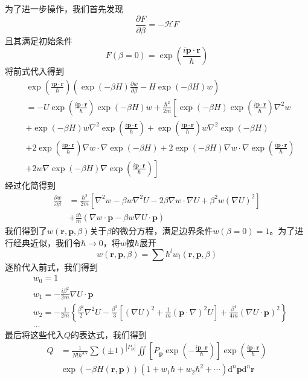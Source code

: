 \documentclass[hyperref,UTF8]{ctexbook}
\newcommand{\bm}[1]{\boldsymbol{#1}}
\begin{document}
为了进一步操作，我们首先发现
\[\frac{\partial F}{\partial\beta}=-\mathcal{H}F\]
且其满足初始条件
\[F(\beta=0)=\exp\left(\frac{i\bm{p}\cdot\bm{r}}{\hbar}\right)\]
将前式代入得到
\begin{align*}
	&\exp\left(\frac{i\bm{p}\cdot\bm{r}}{\hbar}\right)\left(\exp(-\beta H)\frac{\partial w}{\partial\beta}-H\exp(-\beta H)w\right)\\
	&=-U\exp\left(\frac{i\bm{p}\cdot\bm{r}}{\hbar}\right)\exp(-\beta H)w+\frac{\hbar^2}{2m}\left[\exp(-\beta H)\exp\left(\frac{i\bm{p}\cdot\bm{r}}{\hbar}\right)\nabla^2w\right.\\
	&+\exp(-\beta H)w\nabla^2\exp\left(\frac{i\bm{p}\cdot\bm{r}}{\hbar}\right)+\exp\left(\frac{i\bm{p}\cdot\bm{r}}{\hbar}\right)w\nabla^2\exp(-\beta H)\\
	&+2\exp\left(\frac{i\bm{p}\cdot\bm{r}}{\hbar}\right)\nabla w\cdot\nabla\exp(-\beta H)+2\exp(-\beta H)\nabla w\cdot\nabla\exp\left(\frac{i\bm{p}\cdot\bm{r}}{\hbar}\right)\\
	&\left.+2w\nabla\exp(-\beta H)\nabla\exp\left(\frac{i\bm{p}\cdot\bm{r}}{\hbar}\right)\right]
\end{align*}
经过化简得到
\begin{align*}
	\frac{\partial w}{\partial\beta}&=\frac{\hbar^2}{2m}\left[\nabla^2w-\beta w\nabla^2U-2\beta\nabla w\cdot\nabla U+\beta^2w(\nabla U)^2\right]\\
	&+\frac{i\hbar}{m}(\nabla w\cdot\bm{p}-\beta w\nabla U\cdot\bm{p})
\end{align*}
我们得到了$w(\bm{r},\bm{p},\beta)$关于$\beta$的微分方程，满足边界条件$w(\beta=0)=1$。为了进行经典近似，我们令$\hbar\rightarrow0$，将$w$按$\hbar$展开
\[w(\bm{r},\bm{p},\beta)=\sum\hbar^lw_l(\bm{r},\bm{p},\beta)\]
逐阶代入前式，我们得到
\begin{align*}
	&w_0=1\\
	&w_1=-\frac{i\beta^2}{2m}\nabla U\cdot\bm{p}\\
	&w_2=-\frac{1}{2m}\left\{\frac{\beta^2}{2}\nabla^2U-\frac{\beta^3}{3}\left[(\nabla U)^2+\frac{1}{m}(\bm{p}\cdot\nabla)^2U\right]+\frac{\beta^4}{4m}(\nabla U\cdot\bm{p})^2\right\}\\
	&\dots
\end{align*}
\indent 最后将这些代入$Q$的表达式，我们得到
\begin{align*}
	Q&=\frac{1}{N!h^{3N}}\sum(\pm1)^{|P_{\bm{p}}|}\iint\left[P_{\bm{p}}\exp\left(-\frac{i\bm{p}\cdot\bm{r}}{\hbar}\right)\right]\exp\left(\frac{i\bm{p}\cdot\bm{r}}{\hbar}\right)\\
	&\exp(-\beta H(\bm{r},\bm{p}))(1+w_1\hbar+w_2\hbar^2+\cdots)\mathrm{d}^n\bm{p}\mathrm{d}^n\bm{r}
\end{align*}
\end{document}
